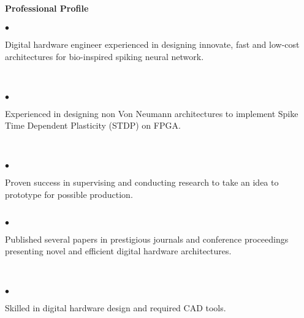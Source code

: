 \bf \large {\selectfont  Professional Profile } \hrulefill \\ \\ \mdseries  \normalsize
$\bullet$  \begin{minipage}[t]{0.98\linewidth}  Digital hardware engineer experienced in designing innovate, fast and low-cost architectures for  bio-inspired spiking neural network.\end{minipage}\\ \\
$\bullet$  \begin{minipage}[t]{0.98\linewidth}  Experienced  in designing non Von Neumann  architectures to implement Spike Time Dependent Plasticity  (STDP) on FPGA.\end{minipage}\\ \\
$\bullet$  \begin{minipage}[t]{0.98\linewidth}  Proven success in supervising and conducting research to take an idea to  prototype for possible production. \end{minipage}\\  
 $\bullet$  \begin{minipage}[t]{0.98\linewidth}  Published several papers in prestigious journals and conference proceedings presenting novel and efficient digital hardware architectures. \end{minipage}\\ \\ 
 $\bullet$  \begin{minipage}[t]{1\linewidth}  Skilled in digital hardware design and required CAD tools. \end{minipage}\\ \\
